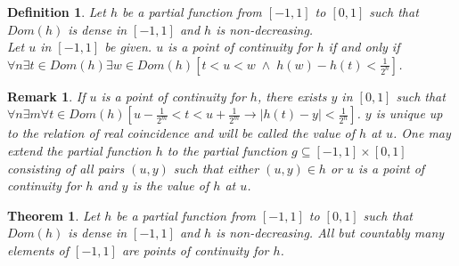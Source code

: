 \documentclass[a4paper]{amsart}
\theoremstyle{plain}
\newtheorem{theorem}{Theorem}
\newtheorem{remark}{Remark}
\newtheorem{definition}{Definition}
\begin{document}
  \begin{definition} Let $h$ be a partial function from $[-1,1]$ to $[0,1]$ such that $Dom(h)$ is dense in $[-1,1]$ and $h$ is non-decreasing. \\Let $u$ in $[-1,1]$ be given. $u$ is a \emph{point of continuity for $h$} if and only if \\$\forall n \exists t \in Dom(h)\exists w\in Dom(h)[t<u<w \;\wedge\; h(w)-h(t) <\frac{1}{2^n}]$. \end{definition}
  
  \begin{remark}\label{R:extension} 
  If $u$ is a point of continuity for $h$, there exists $y$ in $[0,1]$ such that $\forall n\exists m \forall t\in Dom(h)[u-\frac{1}{2^m}<t<u+\frac{1}{2^m} \rightarrow  |h(t)-y|<\frac{1}{2^n}]$. $y$ is unique up to the relation of real coincidence and will be called \emph{the value of $h$ at $u$}. One may extend the  partial function $h$ to the partial function $g\subseteq [-1,1]\times[0,1]$ consisting of all pairs $(u,y)$ such that either $(u,y)\in h$ or $u$ is a point of continuity for $h$ and $y$ is the value of $h$ at $u$. \end{remark}
  \begin{theorem}\label{T:manypointsofcontinuity} Let $h$ be a partial function from $[-1,1]$ to $[0,1]$ such that $Dom(h)$ is dense in $[-1,1]$ and $h$ is non-decreasing. All but countably many elements of $[-1,1]$ are points of continuity for $h$. \end{theorem}
\end{document}

